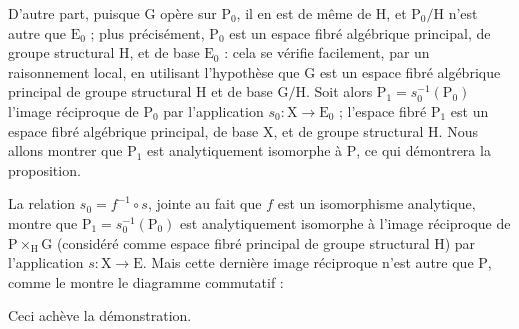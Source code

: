 D'autre part, puisque $\mathrm{G}$ opère sur $\mathrm{P}_0$, il en est de même de $\mathrm{H}$, et $\mathrm{P}_0/\mathrm{H}$ n'est autre que $\mathrm{E}_0$ ; plus précisément, $\mathrm{P}_0$ est un espace fibré algébrique principal, de groupe structural $\mathrm{H}$, et de base $\mathrm{E}_0$ : cela se vérifie facilement, par un raisonnement local, en utilisant l'hypothèse que $\mathrm{G}$ est un espace fibré algébrique principal de groupe structural $\mathrm{H}$ et de base $\mathrm{G}/\mathrm{H}$. Soit alors $\mathrm{P}_1 = s_0^{-1}(\mathrm{P}_0)$ l'image réciproque de $\mathrm{P}_0$ par l'application $s_0 : \mathrm{X} \to \mathrm{E}_0$ ; l'espace fibré $\mathrm{P}_1$ est un espace fibré algébrique principal, de base $\mathrm{X}$, et de groupe structural $\mathrm{H}$. Nous allons montrer que $\mathrm{P}_1$ est analytiquement isomorphe à $\mathrm{P}$, ce qui démontrera la proposition.

La relation $s_0 = f^{-1} \circ s$, jointe au fait que $f$ est un isomorphisme analytique, montre que $\mathrm{P}_1 = s_0^{-1}(\mathrm{P}_0)$ est analytiquement isomorphe à l'image réciproque de $\mathrm{P} \times_{\mathrm{H}} \mathrm{G}$ (considéré comme espace fibré principal de groupe structural $\mathrm{H}$) par l'application $s : \mathrm{X} \to \mathrm{E}$. Mais cette dernière image réciproque n'est autre que $\mathrm{P}$, comme le montre le diagramme commutatif :

\begin{center}
\end{center}
Ceci achève la démonstration.

